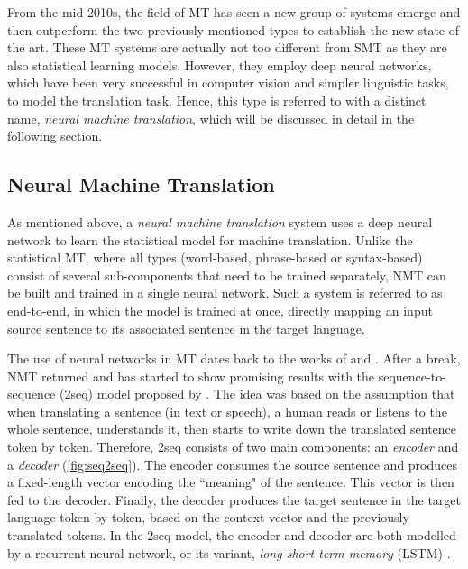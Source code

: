 From the mid 2010s, the field of MT has seen a new group of systems emerge and then outperform the two previously mentioned types to establish the new state of the art.
These MT systems are actually not too different from SMT as they are also statistical learning models.
However, they employ deep neural networks, which have been very successful in computer vision and simpler linguistic tasks, to model the translation task.
Hence, this type is referred to with a distinct name, \textit{neural machine translation}, which will be discussed in detail in the following section.

\subsection{Neural Machine Translation}
\label{the-mt-nmt}
As mentioned above, a \textit{neural machine translation} system uses a deep neural network to learn the statistical model for machine translation.
Unlike the statistical MT, where all types (word-based, phrase-based or syntax-based) consist of several sub-components that need to be trained separately, NMT can be built and trained in a single neural network.
Such a system is referred to as end-to-end, in which the model is trained at once, directly mapping an input source sentence to its associated sentence in the target language.

The use of neural networks in MT dates back to the works of \cite{Castano97machinetranslation} and \cite{neco1997asynchronous}.
After a break, NMT returned and has started to show promising results with the sequence-to-sequence (\seq2seq) model proposed by \cite{DBLP:conf/nips/SutskeverVL14}.
The idea was based on the assumption that when translating a sentence (in text or speech), a human reads or listens to the whole sentence, understands it, then starts to write down the translated sentence token by token.
Therefore, \seq2seq consists of two main components: an \textit{encoder} and a \textit{decoder} (\cref{fig:seq2seq}).
The encoder consumes the source sentence and produces a fixed-length vector encoding the ``meaning" of the sentence.
This vector is then fed to the decoder.
Finally, the decoder produces the target sentence in the target language token-by-token, based on the context vector and the previously translated tokens. 
In the \seq2seq model, the encoder and decoder are both modelled by a recurrent neural network, or its variant, \textit{long-short term memory} (LSTM) \citep{Hochreiter95longshort-term}.

